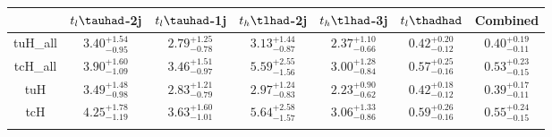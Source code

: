 
\centering
\begin{tabular}{ccccccc} \toprule\toprule
 & $t_l\tauhad$-2j & $t_l\tauhad$-1j & $t_h\tlhad$-2j  & $t_h\tlhad$-3j & $t_l\thadhad$ & Combined \\\midrule
tuH\_all & $3.40^{+1.54}_{-0.95}$ & $2.79^{+1.25}_{-0.78}$ & $3.13^{+1.44}_{-0.87}$ & $2.37^{+1.10}_{-0.66}$ & $0.42^{+0.20}_{-0.12}$ & $0.40^{+0.19}_{-0.11}$\\
tcH\_all & $3.90^{+1.60}_{-1.09}$ & $3.46^{+1.51}_{-0.97}$ & $5.59^{+2.55}_{-1.56}$ & $3.00^{+1.28}_{-0.84}$ & $0.57^{+0.25}_{-0.16}$ & $0.53^{+0.23}_{-0.15}$\\
tuH & $3.49^{+1.48}_{-0.98}$ & $2.83^{+1.21}_{-0.79}$ & $2.97^{+1.24}_{-0.83}$ & $2.23^{+0.90}_{-0.62}$ & $0.42^{+0.18}_{-0.12}$ & $0.39^{+0.17}_{-0.11}$\\
tcH & $4.25^{+1.78}_{-1.19}$ & $3.63^{+1.60}_{-1.01}$ & $5.64^{+2.58}_{-1.57}$ & $3.06^{+1.33}_{-0.86}$ & $0.59^{+0.26}_{-0.16}$ & $0.55^{+0.24}_{-0.15}$\\
\bottomrule\bottomrule\\
\end{tabular}